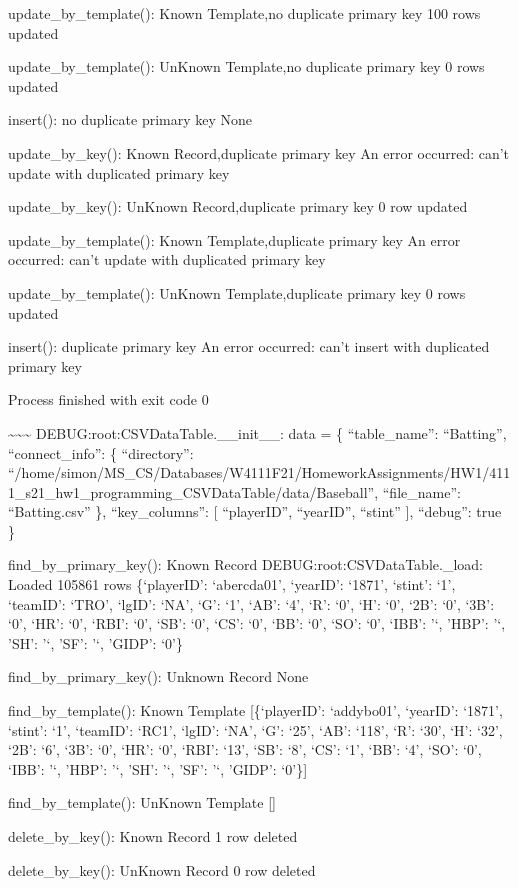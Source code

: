 \documentclass[11pt]{article}
\begin{document}
update\_by\_template(): Known Template,no duplicate primary key 100 rows
updated

update\_by\_template(): UnKnown Template,no duplicate primary key 0 rows
updated

insert(): no duplicate primary key None

update\_by\_key(): Known Record,duplicate primary key An error occurred:
can't update with duplicated primary key

update\_by\_key(): UnKnown Record,duplicate primary key 0 row updated

update\_by\_template(): Known Template,duplicate primary key An error
occurred: can't update with duplicated primary key

update\_by\_template(): UnKnown Template,duplicate primary key 0 rows
updated

insert(): duplicate primary key An error occurred: can't insert with
duplicated primary key

Process finished with exit code 0

    \textasciitilde\textasciitilde\textasciitilde{}
DEBUG:root:CSVDataTable.\_\_init\_\_: data = \{ ``table\_name'':
``Batting'', ``connect\_info'': \{ ``directory'':
``/home/simon/MS\_CS/Databases/W4111F21/HomeworkAssignments/HW1/4111\_s21\_hw1\_programming\_CSVDataTable/data/Baseball'',
``file\_name'': ``Batting.csv'' \}, ``key\_columns'': {[} ``playerID'',
``yearID'', ``stint'' {]}, ``debug'': true \}

find\_by\_primary\_key(): Known Record DEBUG:root:CSVDataTable.\_load:
Loaded 105861 rows \{`playerID': `abercda01', `yearID': `1871', `stint':
`1', `teamID': `TRO', `lgID': `NA', `G': `1', `AB': `4', `R': `0', `H':
`0', `2B': `0', `3B': `0', `HR': `0', `RBI': `0', `SB': `0', `CS': `0',
`BB': `0', `SO': `0', `IBB': '`, 'HBP': '`, 'SH': '`, 'SF': '`, 'GIDP':
`0'\}

find\_by\_primary\_key(): Unknown Record None

find\_by\_template(): Known Template {[}\{`playerID': `addybo01',
`yearID': `1871', `stint': `1', `teamID': `RC1', `lgID': `NA', `G':
`25', `AB': `118', `R': `30', `H': `32', `2B': `6', `3B': `0', `HR':
`0', `RBI': `13', `SB': `8', `CS': `1', `BB': `4', `SO': `0', `IBB': '`,
'HBP': '`, 'SH': '`, 'SF': '`, 'GIDP': `0'\}{]}

find\_by\_template(): UnKnown Template {[}{]}

delete\_by\_key(): Known Record 1 row deleted

delete\_by\_key(): UnKnown Record 0 row deleted
\end{document}
